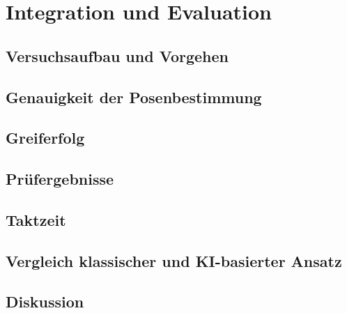 \chapter{Integration und Evaluation}
\label{ch:evaluation}

\section{Versuchsaufbau und Vorgehen}

\section{Genauigkeit der Posenbestimmung}
\section{Greiferfolg}
\section{Prüfergebnisse}

\section{Taktzeit}
\section{Vergleich klassischer und KI-basierter Ansatz}
\section{Diskussion}
